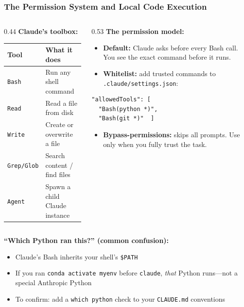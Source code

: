 \documentclass[10pt,english,aspectratio=169]{beamer}
\begin{document}
\begin{frame}[fragile]
\frametitle{The Permission System and Local Code Execution}

\begin{columns}[T]
\begin{column}{0.44\textwidth}
\textbf{Claude's toolbox:}

\vspace{0.15cm}
\footnotesize
\begin{tabular}{|l|p{2.8cm}|}
\hline
\textbf{Tool} & \textbf{What it does} \\ \hline
\texttt{Bash} & Run any shell command \\ \hline
\texttt{Read} & Read a file from disk \\ \hline
\texttt{Write} & Create or overwrite a file \\ \hline
\texttt{Grep/Glob} & Search content / find files \\ \hline
\texttt{Agent} & Spawn a child Claude instance \\ \hline
\end{tabular}
\end{column}
\begin{column}{0.53\textwidth}
\textbf{The permission model:}

\vspace{0.1cm}
\footnotesize
\begin{itemize}
    \item \textbf{Default:} Claude asks before every Bash call. You see the exact command before it runs.
    \item \textbf{Whitelist:} add trusted commands to \texttt{.claude/settings.json}:
\end{itemize}
\begin{lstlisting}[style=pythonstyle,language={},basicstyle=\ttfamily\tiny,numbers=none]
"allowedTools": [
  "Bash(python *)",
  "Bash(git *)"  ]
\end{lstlisting}
\begin{itemize}
    \item \textbf{Bypass-permissions:} skips all prompts. Use only when you fully trust the task.
\end{itemize}
\end{column}
\end{columns}

\vspace{0.2cm}

\textbf{``Which Python ran this?'' (common confusion):}
\begin{itemize}
    \item Claude's Bash inherits your shell's \texttt{\$PATH}
    \item If you ran \texttt{conda activate myenv} before \texttt{claude}, \textit{that} Python runs---not a special Anthropic Python
    \item To confirm: add a \texttt{which python} check to your \texttt{CLAUDE.md} conventions
\end{itemize}
\end{frame}
\end{document}
